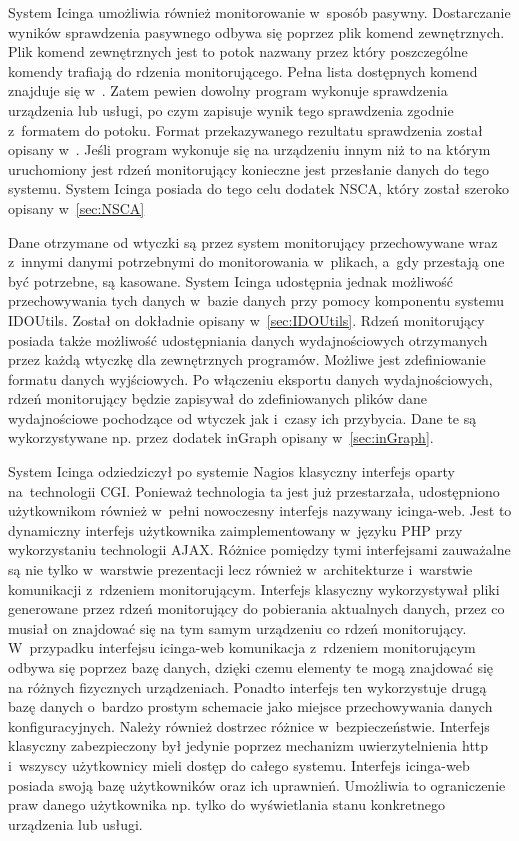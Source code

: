 System Icinga umożliwia również monitorowanie w~sposób
pasywny. Dostarczanie wyników sprawdzenia pasywnego odbywa się poprzez
plik komend zewnętrznych. Plik komend zewnętrznych jest to potok
nazwany przez który poszczególne komendy trafiają do rdzenia
monitorującego. Pełna lista dostępnych komend znajduje się
w~\cite[412-436]{www:IcingaDoc}. Zatem pewien dowolny program wykonuje
sprawdzenia urządzenia lub usługi, po czym zapisuje wynik tego
sprawdzenia zgodnie z~formatem do potoku. Format przekazywanego
rezultatu sprawdzenia został opisany
w~\cite[296-299]{www:IcingaDoc}. Jeśli program wykonuje się na
urządzeniu innym niż to na którym uruchomiony jest rdzeń monitorujący
konieczne jest przesłanie danych do tego systemu. System Icinga
posiada do tego celu dodatek NSCA, który został szeroko opisany
w~\ref{sec:NSCA}

Dane otrzymane od wtyczki są przez system monitorujący przechowywane
wraz z~innymi danymi potrzebnymi do monitorowania w~plikach, a~gdy
przestają one być potrzebne, są kasowane. System Icinga udostępnia
jednak możliwość przechowywania tych danych w~bazie danych przy pomocy
komponentu systemu IDOUtils. Został on dokładnie opisany
w~\ref{sec:IDOUtils}. Rdzeń monitorujący posiada także możliwość
udostępniania danych wydajnościowych otrzymanych przez każdą wtyczkę
dla zewnętrznych programów. Możliwe jest zdefiniowanie formatu danych
wyjściowych. Po włączeniu eksportu danych wydajnościowych, rdzeń
monitorujący będzie zapisywał do zdefiniowanych plików dane
wydajnościowe pochodzące od wtyczek jak i~czasy ich przybycia. Dane te
są wykorzystywane np. przez dodatek inGraph opisany
w~\ref{sec:inGraph}.

System Icinga odziedziczył po systemie Nagios klasyczny interfejs
oparty na~technologii CGI. Ponieważ technologia ta jest już
przestarzała, udostępniono użytkownikom również w~pełni nowoczesny
interfejs nazywany icinga-web. Jest to dynamiczny interfejs
użytkownika zaimplementowany w~języku PHP przy wykorzystaniu
technologii AJAX. Różnice pomiędzy tymi interfejsami zauważalne są nie
tylko w~warstwie prezentacji lecz również w~architekturze i~warstwie
komunikacji z~rdzeniem monitorującym. Interfejs klasyczny
wykorzystywał pliki generowane przez rdzeń monitorujący do pobierania
aktualnych danych, przez co musiał on znajdować się na tym samym
urządzeniu co rdzeń monitorujący. W~przypadku interfejsu icinga-web
komunikacja z~rdzeniem monitorującym odbywa się poprzez bazę danych,
dzięki czemu elementy te mogą znajdować się na różnych fizycznych
urządzeniach. Ponadto interfejs ten wykorzystuje drugą bazę danych
o~bardzo prostym schemacie jako miejsce przechowywania danych
konfiguracyjnych. Należy również dostrzec różnice
w~bezpieczeństwie. Interfejs klasyczny zabezpieczony był jedynie
poprzez mechanizm uwierzytelnienia http i~wszyscy użytkownicy mieli
dostęp do całego systemu. Interfejs icinga-web posiada swoją bazę
użytkowników oraz ich uprawnień. Umożliwia to ograniczenie praw danego
użytkownika np. tylko do wyświetlania stanu konkretnego urządzenia lub
usługi.

